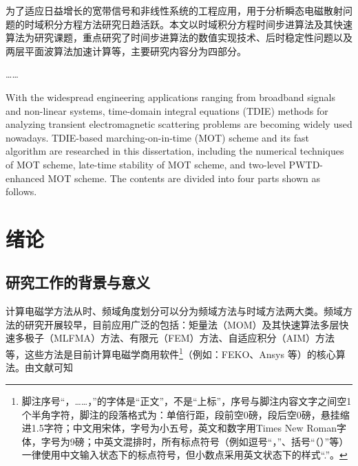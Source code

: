 \documentclass[master]{thesis-uestc}
\author{王稳}{Wang Wen}
\begin{document}
\makecover

\begin{chineseabstract}
为了适应日益增长的宽带信号和非线性系统的工程应用，用于分析瞬态电磁散射问题的时域积分方程方法研究日趋活跃。本文以时域积分方程时间步进算法及其快速算法为研究课题，重点研究了时间步进算法的数值实现技术、后时稳定性问题以及两层平面波算法加速计算等，主要研究内容分为四部分。

……

\end{chineseabstract}

\begin{englishabstract}
With the widespread engineering applications ranging from broadband signals and non-linear systems, time-domain integral equations (TDIE) methods for analyzing transient electromagnetic scattering problems are becoming widely used nowadays. TDIE-based marching-on-in-time (MOT) scheme and its fast algorithm are researched in this dissertation, including the numerical techniques of MOT scheme, late-time stability of MOT scheme, and two-level PWTD-enhanced MOT scheme. The contents are divided into four parts shown as follows.

\end{englishabstract}

\thesistableofcontents

\chapter{绪\hspace{6pt}论}

\section{研究工作的背景与意义}

计算电磁学方法从时、频域角度划分可以分为频域方法与时域方法两大类。频域方法的研究开展较早，目前应用广泛的包括：矩量法（MOM）及其快速算法多层快速多极子（MLFMA）方法、有限元（FEM）方法、自适应积分（AIM）方法等，这些方法是目前计算电磁学商用软件\footnote{脚注序号“，……，”的字体是“正文”，不是“上标”，序号与脚注内容文字之间空1个半角字符，脚注的段落格式为：单倍行距，段前空0磅，段后空0磅，悬挂缩进1.5字符；中文用宋体，字号为小五号，英文和数字用Times New Roman字体，字号为9磅；中英文混排时，所有标点符号（例如逗号“，”、括号“（）”等）一律使用中文输入状态下的标点符号，但小数点采用英文状态下的样式“.”。}（例如：FEKO、Ansys 等）的核心算法。由文献\cite{feng997he,clerc2010discrete,xiao2012yi}可知
\end{document}
